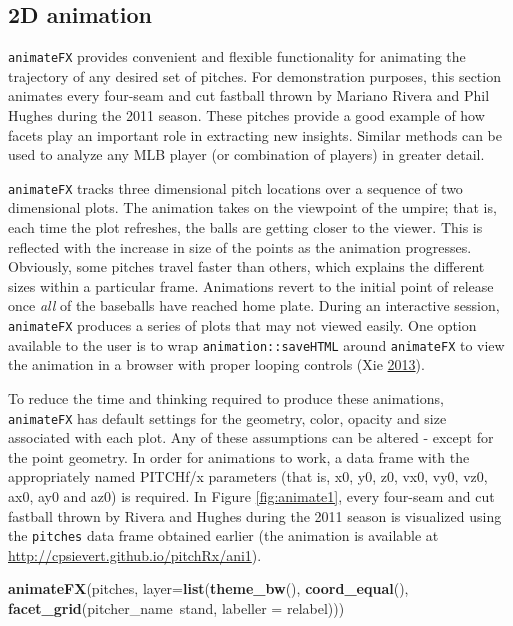 \documentclass[12pt,]{isuthesis}
\newenvironment{Shaded}{\begin{snugshade}}{\end{snugshade}}
\newcommand{\KeywordTok}[1]{\textcolor[rgb]{0.13,0.29,0.53}{\textbf{{#1}}}}
\newcommand{\DataTypeTok}[1]{\textcolor[rgb]{0.13,0.29,0.53}{{#1}}}
\newcommand{\NormalTok}[1]{{#1}}
\begin{document}
\subsection{2D animation}\label{d-animation}

\texttt{animateFX} provides convenient and flexible functionality for
animating the trajectory of any desired set of pitches. For
demonstration purposes, this section animates every four-seam and cut
fastball thrown by Mariano Rivera and Phil Hughes during the 2011
season. These pitches provide a good example of how facets play an
important role in extracting new insights. Similar methods can be used
to analyze any MLB player (or combination of players) in greater detail.

\texttt{animateFX} tracks three dimensional pitch locations over a
sequence of two dimensional plots. The animation takes on the viewpoint
of the umpire; that is, each time the plot refreshes, the balls are
getting closer to the viewer. This is reflected with the increase in
size of the points as the animation progresses. Obviously, some pitches
travel faster than others, which explains the different sizes within a
particular frame. Animations revert to the initial point of release once
\emph{all} of the baseballs have reached home plate. During an
interactive session, \texttt{animateFX} produces a series of plots that
may not viewed easily. One option available to the user is to wrap
\texttt{animation::saveHTML} around \texttt{animateFX} to view the
animation in a browser with proper looping controls (Xie
\protect\hyperlink{ref-animation}{2013}).

To reduce the time and thinking required to produce these animations,
\texttt{animateFX} has default settings for the geometry, color, opacity
and size associated with each plot. Any of these assumptions can be
altered - except for the point geometry. In order for animations to
work, a data frame with the appropriately named PITCHf/x parameters
(that is, x0, y0, z0, vx0, vy0, vz0, ax0, ay0 and az0) is required. In
Figure \ref{fig:animate1}, every four-seam and cut fastball thrown by
Rivera and Hughes during the 2011 season is visualized using the
\texttt{pitches} data frame obtained earlier (the animation is available
at \url{http://cpsievert.github.io/pitchRx/ani1}).

\begin{Shaded}
\begin{Highlighting}[]
\KeywordTok{animateFX}\NormalTok{(pitches, }\DataTypeTok{layer=}\KeywordTok{list}\NormalTok{(}\KeywordTok{theme_bw}\NormalTok{(), }\KeywordTok{coord_equal}\NormalTok{(),}
  \KeywordTok{facet_grid}\NormalTok{(pitcher_name~stand, }\DataTypeTok{labeller =} \NormalTok{relabel)))}
\end{Highlighting}
\end{Shaded}
\end{document}
